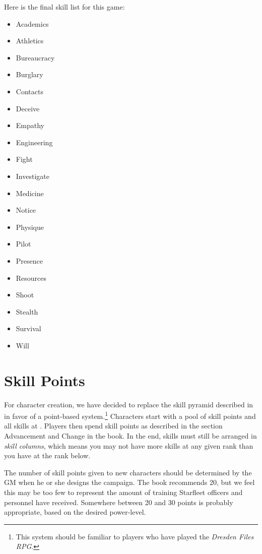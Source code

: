 \documentclass[12pt,titlepage,openany]{book}
\begin{document}
Here is the final skill list for this game:

\begin{multicols}{3}
    \raggedcolumns
    \begin{itemize}
        \item Academics
        \item Athletics
        \item Bureaucracy
        \item Burglary
        \item Contacts
        \item Deceive
        \item Empathy
        \item Engineering
        \item Fight
        \item Investigate
        \item Medicine
        \item Notice
        \item Physique
        \item Pilot
        \item Presence
        \item Resources
        \item Shoot
        \item Stealth
        \item Survival
        \item Will
    \end{itemize}
\end{multicols}

\section{Skill Points}\label{sec:skill-points}

For character creation, we have decided to replace the skill pyramid described
in \FateCore{} in favor of a point-based system.\footnote{This system should be
familiar to players who have played the \emph{Dresden Files RPG}.} Characters
start with a pool of skill points and all skills at . Players
then spend skill points as described in the section Advancement and Change in
the \FateCore{} book. In the end, skills must still be arranged in \emph{skill
columns}, which means you may not have more skills at any given rank than you
have at the rank below.

The number of skill points given to new characters should be determined by the
GM when he or she designs the campaign. The \FateCore{} book recommends 20, but
we feel this may be too few to represent the amount of training Starfleet
officers and personnel have received. Somewhere between 20 and 30 points is
probably appropriate, based on the desired power-level.
\end{document}
